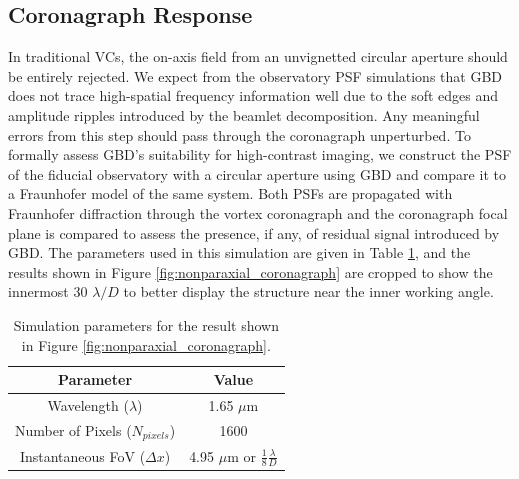 \subsection{Coronagraph Response}
In traditional VCs, the on-axis field from an unvignetted circular aperture should be entirely rejected. We expect from the observatory PSF simulations that GBD does not trace high-spatial frequency information well due to the soft edges and amplitude ripples introduced by the beamlet decomposition. Any meaningful errors from this step should pass through the coronagraph unperturbed. To formally assess GBD's suitability for high-contrast imaging, we construct the PSF of the fiducial observatory with a circular aperture using GBD and compare it to a Fraunhofer model of the same system. Both PSFs are propagated with Fraunhofer diffraction through the vortex coronagraph and the coronagraph focal plane is compared to assess the presence, if any, of residual signal introduced by GBD. The parameters used in this simulation are given in Table \ref{tab:coro_params}, and the results shown in Figure \ref{fig:nonparaxial_coronagraph} are cropped to show the innermost 30 $\lambda / D$ to better display the structure near the inner working angle.

\begin{table}[H]
    \centering
    \begin{tabular}{c|c}
       \hline
       Parameter  & Value  \\
       \hline
        Wavelength ($\lambda$) & 1.65 $\mu$m \\
        Number of Pixels ($N_{pixels}$) & 1600 \\
        Instantaneous FoV ($\Delta x$) & 4.95 $\mu$m or $\frac{1}{8}\frac{\lambda}{D}$\\
       \hline
       \hline
    \end{tabular}
    \\
    \caption{Simulation parameters for the result shown in Figure \ref{fig:nonparaxial_coronagraph}. 
    }
    \label{tab:coro_params}
\end{table}

